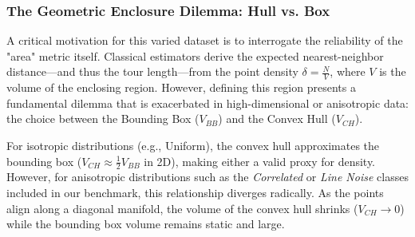 \documentclass{article}
\begin{document}
\begin{table}[!ht]
\centering
\caption{2D Benchmark Dataset Composition ($N_{total} = 2,580$)}
\label{tab:dataset_counts}
\end{table}

\subsubsection{The Geometric Enclosure Dilemma: Hull vs. Box}
A critical motivation for this varied dataset is to interrogate the reliability of the "area" metric itself. Classical estimators derive the expected nearest-neighbor distance—and thus the tour length—from the point density $\delta = \frac{N}{V}$, where $V$ is the volume of the enclosing region. However, defining this region presents a fundamental dilemma that is exacerbated in high-dimensional or anisotropic data: the choice between the Bounding Box ($V_{BB}$) and the Convex Hull ($V_{CH}$).

For isotropic distributions (e.g., Uniform), the convex hull approximates the bounding box ($V_{CH} \approx \frac{1}{2} V_{BB}$ in 2D), making either a valid proxy for density. However, for anisotropic distributions such as the \textit{Correlated} or \textit{Line Noise} classes included in our benchmark, this relationship diverges radically. As the points align along a diagonal manifold, the volume of the convex hull shrinks ($V_{CH} \to 0$) while the bounding box volume remains static and large. 
\end{document}
